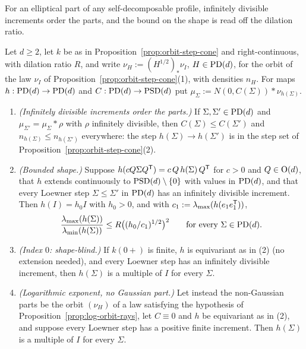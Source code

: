 For an elliptical part of any self-decomposable profile, infinitely divisible increments order the
parts, and the bound on the shape is read off the dilation ratio.

\begin{proposition}\label{prop:similarity-orbit-family}
Let $d \ge 2$, let $k$ be as in Proposition~\ref{prop:orbit-step-cone} and right-continuous, with dilation ratio
$R$, and write $\nu_H := (H^{1/2})_*\nu_I$, $H \in \mathrm{PD}(d)$, for the orbit of the law $\nu_I$ of
Proposition~\ref{prop:orbit-step-cone}(1), with \Levy{} densities $n_H$. For maps $h : \mathrm{PD}(d) \to \mathrm{PD}(d)$ and
$C : \mathrm{PD}(d) \to \mathrm{PSD}(d)$ put $\mu_\Sigma := N(0,C(\Sigma)) * \nu_{h(\Sigma)}$.
\begin{enumerate}
\item \emph{(Infinitely divisible increments order the parts.)} If $\Sigma, \Sigma' \in \mathrm{PD}(d)$ and
$\mu_{\Sigma'} = \mu_\Sigma * \rho$ with $\rho$ infinitely divisible, then $C(\Sigma) \le C(\Sigma')$
and $n_{h(\Sigma)} \le n_{h(\Sigma')}$ everywhere: the step $h(\Sigma) \to h(\Sigma')$ is in the step
set of Proposition~\ref{prop:orbit-step-cone}(2).
\item \emph{(Bounded shape.)} Suppose $h(cQ\Sigma Q^{\mathsf{T}}) = c\,Q\,h(\Sigma)\,Q^{\mathsf{T}}$ for $c > 0$ and
$Q \in \mathrm{O}(d)$, that $h$ extends continuously to $\mathrm{PSD}(d) \setminus \{0\}$ with values in $\mathrm{PD}(d)$,
and that every Loewner step $\Sigma \le \Sigma'$ in $\mathrm{PD}(d)$ has an infinitely divisible increment.
Then $h(I) = h_0I$ with $h_0 > 0$, and with $c_1 := \lambda_{\max}(h(e_1e_1^{\mathsf{T}}))$,
\[
  \frac{\lambda_{\max}(h(\Sigma))}{\lambda_{\min}(h(\Sigma))} \le R\bigl((h_0/c_1)^{1/2}\bigr)^2
  \qquad \text{for every } \Sigma \in \mathrm{PD}(d) .
\]
\item \emph{(Index $0$: shape-blind.)} If $k(0{+})$ is finite, $h$ is equivariant as in (2) (no
extension needed), and every Loewner step has an infinitely divisible increment, then $h(\Sigma)$
is a multiple of $I$ for every $\Sigma$.
\item \emph{(Logarithmic exponent, no Gaussian part.)} Let instead the non-Gaussian parts be the
orbit $(\nu_H)$ of a law satisfying the hypothesis of Proposition~\ref{prop:log-orbit-rays}, let $C \equiv 0$
and $h$ be equivariant as in (2), and suppose every Loewner step has a positive finite increment.
Then $h(\Sigma)$ is a multiple of $I$ for every $\Sigma$.
\end{enumerate}
\end{proposition}

